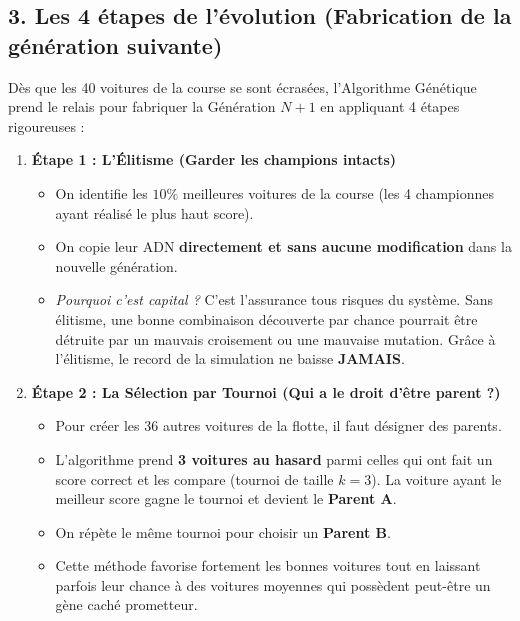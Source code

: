 \documentclass[12pt,a4paper]{article}
\begin{document}
\subsection{3. Les 4 étapes de l'évolution (Fabrication de la génération suivante)}
Dès que les 40 voitures de la course se sont écrasées, l'Algorithme Génétique prend le relais pour fabriquer la Génération $N+1$ en appliquant 4 étapes rigoureuses :

\begin{enumerate}[leftmargin=*]
  \item \textbf{Étape 1 : L'Élitisme (Garder les champions intacts)}
  \begin{itemize}
    \item On identifie les $10\%$ meilleures voitures de la course (les 4 championnes ayant réalisé le plus haut score).
    \item On copie leur ADN \textbf{directement et sans aucune modification} dans la nouvelle génération.
    \item \textit{Pourquoi c'est capital ?} C'est l'assurance tous risques du système. Sans élitisme, une bonne combinaison découverte par chance pourrait être détruite par un mauvais croisement ou une mauvaise mutation. Grâce à l'élitisme, le record de la simulation ne baisse \textbf{JAMAIS}.
  \end{itemize}

  \item \textbf{Étape 2 : La Sélection par Tournoi (Qui a le droit d'être parent ?)}
  \begin{itemize}
    \item Pour créer les 36 autres voitures de la flotte, il faut désigner des parents.
    \item L'algorithme prend \textbf{3 voitures au hasard} parmi celles qui ont fait un score correct et les compare (tournoi de taille $k=3$). La voiture ayant le meilleur score gagne le tournoi et devient le \textbf{Parent A}.
    \item On répète le même tournoi pour choisir un \textbf{Parent B}.
    \item Cette méthode favorise fortement les bonnes voitures tout en laissant parfois leur chance à des voitures moyennes qui possèdent peut-être un gène caché prometteur.
  \end{itemize}


\end{enumerate}
\end{document}
